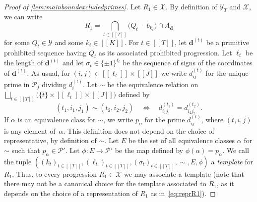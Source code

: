 \documentclass[11pt]{amsart}
\theoremstyle{definition}
\newcommand{\sinterval}[1]{[\![#1]\!] }
\newcommand{\primes}{\mathcal{P}}
\renewcommand{\d}{\boldsymbol{d}}
\newcommand{\sommespart}{b}
\newcommand{\progression}{A_{\d}}
\newcommand{\prohibprog}{\mathcal{Y}}
\newcommand{\newK}{\sinterval{K}}
\newcommand{\newR}{\sinterval{J}}
\newcommand{\sofprog}{\mathcal{Y}_{\ncond}}
\newcommand{\ncond}{T}
\newcommand{\somesigns}{\sigma}
\newcommand{\sset}{\primes'}
\begin{document}
\begin{proof}[Proof of \cref{lem:mainboundexcludedprimes}]
Let $R_1\in \mathcal{X}$. By definition of $\sofprog$ and $\mathcal{X}$, we can write 
\begin{equation}
\label{eq:reprR1}
	R_1 = \bigcap_{t\in \sinterval{\ncond}} \big(Q_t - \sommespart_{k_t}\big) \cap \progression
\end{equation}
for some $Q_t\in \prohibprog$ and some $k_t\in \newK$. For $t\in \sinterval{\ncond}$, let $\d^{(t)}$ be a primitive prohibited sequence having $Q_t$ as its associated prohibited progression. Let $\ell_t$ be the length of $\d^{(t)}$ and let $\somesigns_t\in \{\pm1\}^{\ell_t}$ be the sequence of signs of the coordinates of $\d^{(t)}$. As usual, for $(i,j)\in \sinterval{\ell_t} \!\times \!\newR$ we write $d^{(t)}_{ij}$ for the unique prime in $\primes_j$ dividing $d^{(t)}_i$. Let $\sim$ be the equivalence relation on $\bigsqcup_{t\in \sinterval{\ncond}} \big(\{t\}\!\times \!\sinterval{\ell_t} \!\times \!\newR\big)$ defined by 
\begin{equation*}
	(t_1,i_1,j_1) \sim (t_2,i_2,j_2) \quad \iff \quad d^{(t_1)}_{i_1j_1} = d^{(t_2)}_{i_2j_2}.
\end{equation*}
If $\alpha$ is an equivalence class for $\sim$, we write $p_{\alpha}$ for the prime $d^{(t)}_{ij}$, where $(t,i,j)$ is any element of~$\alpha$. This definition does not depend on the choice of representative, by definition of $\sim$. Let $E$ be the set of all equivalence classes $\alpha$ for $\sim$ such that $p_{\alpha} \in \sset$. Let $\phi : E \to\sset$ be the map defined by $\phi(\alpha) = p_{\alpha}$. We call the tuple $((k_t)_{t\in \sinterval{\ncond}}, (\ell_t)_{t\in \sinterval{\ncond}}, (\somesigns_t)_{t\in \sinterval{\ncond}}, \sim, E, \phi)$ a \emph{template} for $R_1$. Thus, to every progression $R_1\in \mathcal{X}$ we may associate a template (note that there may not be a canonical choice for the template associated to $R_1$, as it depends on the choice of a representation of $R_1$ as in~\cref{eq:reprR1}).


\end{proof}
\end{document}
